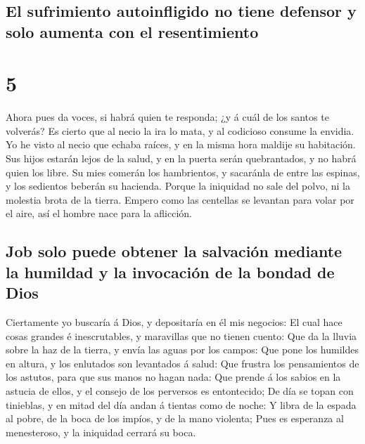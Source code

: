 \hypertarget{el-sufrimiento-autoinfligido-no-tiene-defensor-y-solo-aumenta-con-el-resentimiento}{%
\subsection{El sufrimiento autoinfligido no tiene defensor y solo
aumenta con el
resentimiento}\label{el-sufrimiento-autoinfligido-no-tiene-defensor-y-solo-aumenta-con-el-resentimiento}}

\hypertarget{section-4}{%
\section{5}\label{section-4}}

 Ahora pues da voces, si habrá quien te responda; ¿y á cuál
de los santos te volverás?  Es cierto que al necio la ira lo
mata, y al codicioso consume la envidia.  Yo he visto al
necio que echaba raíces, y en la misma hora maldije su habitación.
 Sus hijos estarán lejos de la salud, y en la puerta serán
quebrantados, y no habrá quien los libre.  Su mies comerán
los hambrientos, y sacaránla de entre las espinas, y los sedientos
beberán su hacienda.  Porque la iniquidad no sale del polvo,
ni la molestia brota de la tierra.  Empero como las
centellas se levantan para volar por el aire, así el hombre nace para la
aflicción.

\hypertarget{job-solo-puede-obtener-la-salvaciuxf3n-mediante-la-humildad-y-la-invocaciuxf3n-de-la-bondad-de-dios}{%
\subsection{Job solo puede obtener la salvación mediante la humildad y
la invocación de la bondad de
Dios}\label{job-solo-puede-obtener-la-salvaciuxf3n-mediante-la-humildad-y-la-invocaciuxf3n-de-la-bondad-de-dios}}

 Ciertamente yo buscaría á Dios, y depositaría en él mis
negocios:  El cual hace cosas grandes é inescrutables, y
maravillas que no tienen cuento:  Que da la lluvia sobre la
haz de la tierra, y envía las aguas por los campos:  Que
pone los humildes en altura, y los enlutados son levantados á salud:
 Que frustra los pensamientos de los astutos, para que sus
manos no hagan nada:  Que prende á los sabios en la astucia
de ellos, y el consejo de los perversos es entontecido;  De
día se topan con tinieblas, y en mitad del día andan á tientas como de
noche:  Y libra de la espada al pobre, de la boca de los
impíos, y de la mano violenta;  Pues es esperanza al
menesteroso, y la iniquidad cerrará su boca.

